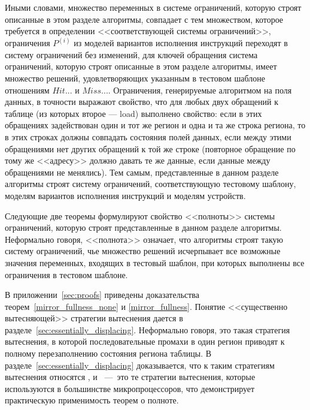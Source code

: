 
Иными словами, множество переменных в системе ограничений, которую строят описанные в этом разделе алгоритмы, совпадает с тем множеством, которое требуется в определении <<соответствующей системы ограничений>>, ограничения $P^{(i)}$ из моделей вариантов исполнения инструкций переходят в систему ограничений без изменений, для ключей обращения система ограничений, которую строят описанные в этом разделе алгоритмы, имеет множество решений, удовлетворяющих указанным в тестовом шаблоне отношениям $Hit...$ и $Miss...$. Ограничения, генерируемые алгоритмом на поля данных, в точности выражают свойство, что для любых двух обращений к таблице (из которых второе --- load) выполнено свойство: если в этих обращениях задействован один и тот же регион и одна и та же строка региона, то в этих строках должны совпадать состояния полей данных, если между этими обращениями нет других обращений к той же строке (повторное обращение по тому же <<адресу>> должно давать те же данные, если данные между обращениями не менялись). Тем самым, представленные в данном разделе алгоритмы строят систему ограничений, соответствующую тестовому шаблону, моделям вариантов исполнения инструкций и моделям устройств.

Следующие две теоремы формулируют свойство <<полноты>> системы ограничений, которую строят представленные в данном разделе алгоритмы. Неформально говоря, <<полнота>> означает, что алгоритмы строят такую систему ограничений, чье множество решений исчерпывает все возможные значения переменных, входящих в тестовый шаблон, при которых выполнены все ограничения в тестовом шаблоне.

\begin{theorem}\label{mirror_fullness_none}
\FullnessMirrorNone
\end{theorem}

\begin{theorem}\label{mirror_fullness}
\FullnessMirror
\end{theorem}

В приложении~\ref{sec:proofs} приведены доказательства теорем~\ref{mirror_fullness_none} и \ref{mirror_fullness}. Понятие <<существенно вытесняющей>> стратегии вытеснения дается в разделе~\ref{sec:essentially_displacing}. Неформально говоря, это такая стратегия вытеснения, в которой последовательные промахи в один регион приводят к полному перезаполнению состояния региона таблицы. В разделе~\ref{sec:essentially_displacing} доказывается, что к таким стратегиям вытеснения относятся \LRU, \FIFO и \PseudoLRU~---~это те стратегии вытеснения, которые используются в большинстве микропроцессоров, что демонстрирует практическую применимость теорем о полноте.

